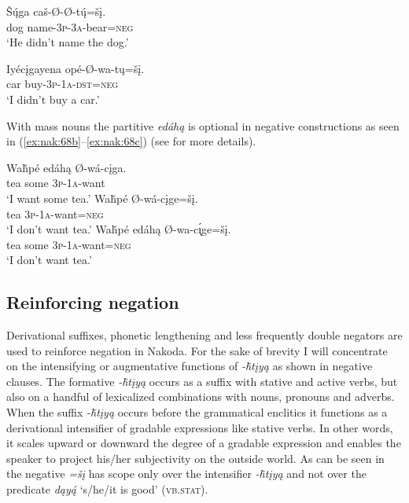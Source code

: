 \documentclass[output=paper,colorlinks,citecolor=brown]{langscibook}
\begin{document}
\ea\label{ex:nak:66}
    \gll Š\'{ų}ga caš-Ø-Ø-t\'{ų}=šį. \\
         dog name-\textsc{3p-3a}-bear=\textsc{neg} \\
    \glt ‘He didn’t name the dog.’
\z 

\ea\label{ex:nak:67}
    \gll Iyécįgayena opé-Ø-wa-tų=šį. \\
         car buy-\textsc{3p-1a-dst=neg} \\
    \glt ‘I didn’t buy a car.’
\z 

With mass nouns the partitive \textit{edáhą} is optional in negative constructions as seen in (\ref{ex:nak:68b}--\ref{ex:nak:68c}) (see \citealt{Miestamo2014} for more details).


\ea\label{ex:nak:68}
    \ea\label{ex:nak:68a}
        \gll Waȟpé edáhą Ø-wá-cįga. \\
             tea some \textsc{3p-1a}-want \\
        \glt ‘I want some tea.’
    \ex\label{ex:nak:68b}
        \gll Waȟpé Ø-wá-cįge=šį. \\
             tea \textsc{3p-1a}-want=\textsc{neg} \\
        \glt ‘I don’t want tea.’
    \ex\label{ex:nak:68c}
        \gll Waȟpé edáhą Ø-wa-c\k{\'{ı}}ge=šį. \\
             tea some \textsc{3p-1a}-want=\textsc{neg} \\
        \glt ‘I don’t want tea.’
    \z
\z 


\subsection{Reinforcing negation}\label{sec:nak:4.3}

Derivational suffixes, phonetic lengthening and less frequently double negators are used to reinforce negation in Nakoda. For the sake of brevity I will concentrate on the intensifying or augmentative functions of \textit{-ȟtįyą} as shown in negative clauses. The formative \textit{-ȟtįyą} occurs as a suffix with stative and active verbs, but also on a handful of lexicalized combinations with nouns, pronouns and adverbs. When the suffix \textit{-ȟtįyą} occurs before the grammatical enclitics it functions as a derivational intensifier of gradable expressions like stative verbs. In other words, it scales upward or downward the degree of a gradable expression and enables the speaker to project his/her subjectivity on the outside world. As can be seen in  the negative \textit{=šį} has scope only over the intensifier \textit{-ȟtįyą} and not over the predicate \textit{dąy\'{ą}} ‘s/he/it is good’ (\textsc{vb.stat}).
\end{document}
